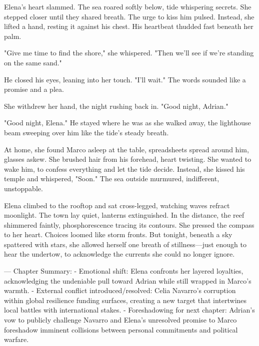 Elena's heart slammed. The sea roared softly below, tide whispering secrets. She stepped closer until they shared breath. The urge to kiss him pulsed. Instead, she lifted a hand, resting it against his chest. His heartbeat thudded fast beneath her palm.

"Give me time to find the shore," she whispered. "Then we'll see if we're standing on the same sand."

He closed his eyes, leaning into her touch. "I'll wait." The words sounded like a promise and a plea.

She withdrew her hand, the night rushing back in. "Good night, Adrian."

"Good night, Elena." He stayed where he was as she walked away, the lighthouse beam sweeping over him like the tide's steady breath.

At home, she found Marco asleep at the table, spreadsheets spread around him, glasses askew. She brushed hair from his forehead, heart twisting. She wanted to wake him, to confess everything and let the tide decide. Instead, she kissed his temple and whispered, "Soon." The sea outside murmured, indifferent, unstoppable.

Elena climbed to the rooftop and sat cross-legged, watching waves refract moonlight. The town lay quiet, lanterns extinguished. In the distance, the reef shimmered faintly, phosphorescence tracing its contours. She pressed the compass to her heart. Choices loomed like storm fronts. But tonight, beneath a sky spattered with stars, she allowed herself one breath of stillness—just enough to hear the undertow, to acknowledge the currents she could no longer ignore.

\bigskip

---
Chapter Summary:
- Emotional shift: Elena confronts her layered loyalties, acknowledging the undeniable pull toward Adrian while still wrapped in Marco's warmth.
- External conflict introduced/resolved: Celia Navarro's corruption within global resilience funding surfaces, creating a new target that intertwines local battles with international stakes.
- Foreshadowing for next chapter: Adrian's vow to publicly challenge Navarro and Elena's unresolved promise to Marco foreshadow imminent collisions between personal commitments and political warfare.
